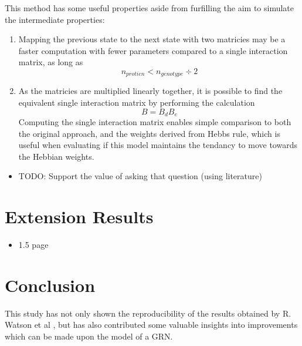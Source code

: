 \documentclass[twocolumn,a4paper]{article}
\begin{document}
    This method has some useful properties aside from furfilling the aim to simulate the intermediate properties:
    \begin{enumerate}
        \item Mapping the previous state to the next state with two matricies may be a faster computation with fewer parameters compared to a single interaction matrix, as long as
        \begin{equation}
            n_{protien} < n_{genotype} \div 2
        \end{equation}
            
        \item As the matricies are multiplied linearly together, it is possible to find the equivalent single interaction matrix by performing the calculation
        \begin{equation}
            B = B_dB_e
        \end{equation}
        Computing the single interaction matrix enables simple comparison to both the original approach, and the weights derived from Hebbs rule, which is useful when evaluating if this model maintains the tendancy to move towards the Hebbian weights.
    \end{enumerate}
    \begin{itemize}
        \item TODO: Support the value of asking that question (using literature)
    \end{itemize}


    \section{Extension Results}
    \begin{itemize}
        \item 1.5 page
    \end{itemize}


    \section{Conclusion}
    This study has not only shown the reproducibility of the results obtained by R. Watson et al \cite{rich}, but has also contributed some valuable insights into improvements which can be made upon the model of a GRN.
\end{document}
